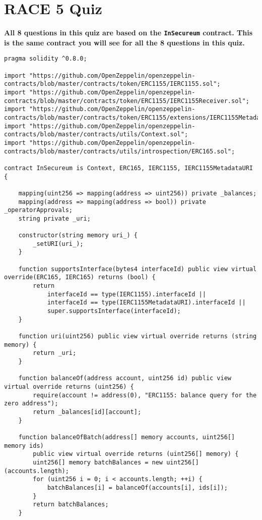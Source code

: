 \section{RACE 5 Quiz}

\textbf{All 8 questions in this quiz are based on the \texttt{InSecureum} contract.
This is the same contract you will see for all the 8 questions in this quiz.}

\begin{lstlisting}[language=Solidity, style=solStyle]
pragma solidity ^0.8.0;

import "https://github.com/OpenZeppelin/openzeppelin-contracts/blob/master/contracts/token/ERC1155/IERC1155.sol";
import "https://github.com/OpenZeppelin/openzeppelin-contracts/blob/master/contracts/token/ERC1155/IERC1155Receiver.sol";
import "https://github.com/OpenZeppelin/openzeppelin-contracts/blob/master/contracts/token/ERC1155/extensions/IERC1155MetadataURI.sol";
import "https://github.com/OpenZeppelin/openzeppelin-contracts/blob/master/contracts/utils/Context.sol";
import "https://github.com/OpenZeppelin/openzeppelin-contracts/blob/master/contracts/utils/introspection/ERC165.sol";

contract InSecureum is Context, ERC165, IERC1155, IERC1155MetadataURI {

    mapping(uint256 => mapping(address => uint256)) private _balances;
    mapping(address => mapping(address => bool)) private _operatorApprovals;
    string private _uri;

    constructor(string memory uri_) {
        _setURI(uri_);
    }

    function supportsInterface(bytes4 interfaceId) public view virtual override(ERC165, IERC165) returns (bool) {
        return
            interfaceId == type(IERC1155).interfaceId ||
            interfaceId == type(IERC1155MetadataURI).interfaceId ||
            super.supportsInterface(interfaceId);
    }

    function uri(uint256) public view virtual override returns (string memory) {
        return _uri;
    }

    function balanceOf(address account, uint256 id) public view virtual override returns (uint256) {
        require(account != address(0), "ERC1155: balance query for the zero address");
        return _balances[id][account];
    }

    function balanceOfBatch(address[] memory accounts, uint256[] memory ids)
        public view virtual override returns (uint256[] memory) {
        uint256[] memory batchBalances = new uint256[](accounts.length);
        for (uint256 i = 0; i < accounts.length; ++i) {
            batchBalances[i] = balanceOf(accounts[i], ids[i]);
        }
        return batchBalances;
    }


\end{lstlisting}
